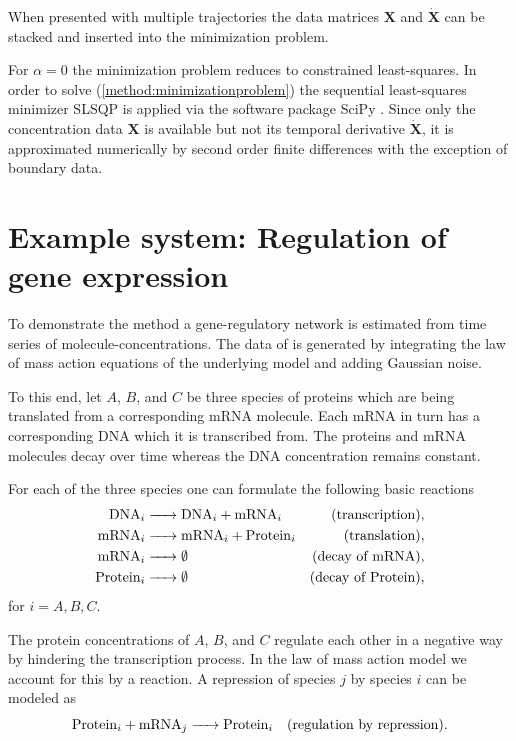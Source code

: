 \documentclass[oneside, abstracton, titlepage]{scrartcl}
\begin{document}
	When presented with multiple trajectories the data matrices $\mathbf{X}$ and $\dot{\mathbf{X}}$ can be stacked and inserted into the minimization problem.
	
	For $\alpha=0$ the minimization problem reduces to constrained least-squares. In order to solve (\ref{method:minimizationproblem}) the sequential least-squares minimizer SLSQP \cite{Kraft1988} is applied via the software package SciPy \cite{SciPy}. Since only the concentration data $\mathbf{X}$ is available but not its temporal derivative $\dot{\mathbf{X}}$, it is approximated numerically by second order finite differences with the exception of boundary data.

    \section{Example system: Regulation of gene expression}\label{sec:generegulation}

    To demonstrate the method a gene-regulatory network is estimated from time series of molecule-concentrations. The data of is generated by integrating the law of mass action equations of the underlying model and adding Gaussian noise.
    
    To this end, let $A$, $B$, and $C$ be three species of proteins which are being translated from a corresponding mRNA molecule. Each mRNA in turn has a corresponding DNA which it is transcribed from. The proteins and mRNA molecules decay over time whereas the DNA concentration remains constant.
    
    For each of the three species one can formulate the following basic reactions
	\begin{align*}
        \ce{ DNA_i } & \ce{ -> DNA_i + mRNA_i } &\text{(transcription)}, \\
        \ce{ mRNA_i } & \ce{ -> mRNA_i + Protein_i } &\text{(translation)}, \\
        \ce{ mRNA_i } & \ce{ -> } \emptyset &\text{(decay of mRNA)}, \\
        \ce{ Protein_i } & \ce{ -> } \emptyset &\text{(decay of Protein)},
    \end{align*}
    for $i=A,B,C$.

    The protein concentrations of $A$, $B$, and $C$ regulate each other in a negative way by hindering the transcription process. In the law of mass action model we account for this by a reaction. A repression of species $j$ by species $i$ can be modeled as
    \begin{equation*}
        \ce{ Protein_i + mRNA_j -> Protein_i } \quad \text{(regulation by repression)}.
    \end{equation*}
\end{document}
